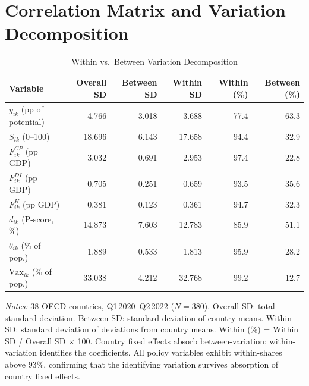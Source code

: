 \documentclass[12pt, a4paper]{article}
\begin{document}
\section{Correlation Matrix and Variation Decomposition}
\label{sec:correlation_matrix}


\begin{table}[H]
\centering
\caption{Within vs.\ Between Variation Decomposition}
\label{tab:within_between}
\scriptsize
\renewcommand{\arraystretch}{1.15}
\begin{tabular}{@{} l r r r r r @{}}
\toprule
\textbf{Variable} & \textbf{Overall SD} & \textbf{Between SD} & \textbf{Within SD}
  & \textbf{Within (\%)} & \textbf{Between (\%)} \\
\midrule
$y_{ik}$ (pp of potential)       & 4.766 & 3.018 & 3.688 & 77.4 & 63.3 \\
$S_{ik}$ (0--100)                & 18.696 & 6.143 & 17.658 & 94.4 & 32.9 \\
$F^{CP}_{ik}$ (pp GDP)          & 3.032 & 0.691 & 2.953 & 97.4 & 22.8 \\
$F^{DI}_{ik}$ (pp GDP)          & 0.705 & 0.251 & 0.659 & 93.5 & 35.6 \\
$F^{H}_{ik}$ (pp GDP)           & 0.381 & 0.123 & 0.361 & 94.7 & 32.3 \\
$d_{ik}$ (P-score, \%)          & 14.873 & 7.603 & 12.783 & 85.9 & 51.1 \\
$\theta_{ik}$ (\% of pop.)      & 1.889 & 0.533 & 1.813 & 95.9 & 28.2 \\
$\text{Vax}_{ik}$ (\% of pop.)  & 33.038 & 4.212 & 32.768 & 99.2 & 12.7 \\
\bottomrule
\end{tabular}
\vspace{4pt}

\parbox{\textwidth}{\scriptsize\textit{Notes:} 38 OECD countries,
Q1\,2020--Q2\,2022 ($N = 380$). Overall SD: total standard deviation.
Between SD: standard deviation of country means. Within SD: standard
deviation of deviations from country means. Within (\%) = Within SD /
Overall SD $\times$ 100. Country fixed effects absorb between-variation;
within-variation identifies the coefficients. All policy variables
exhibit within-shares above 93\%, confirming that the identifying
variation survives absorption of country fixed effects.}
\end{table}
\end{document}
